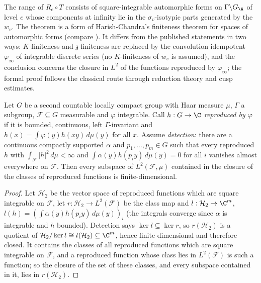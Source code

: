\begin{remark}
The range of $R_e\circ T$ consists of square-integrable automorphic forms on $\Gamma\backslash G_\A$ of level
$e$ whose components at infinity lie in the $\sigma_v$-isotypic parts generated by the $w_v$. The theorem is a form
of Harish-Chandra's finiteness theorem for spaces of automorphic forms \cite{HarishChandra1968} (compare
\cite{BorelJacquet1979}). It differs from the published statements in two ways: $K$-finiteness and
$\mathfrak z$-finiteness are replaced by the convolution idempotent $\varphi_\infty$ of integrable discrete series
(no $K$-finiteness of $w_v$ is assumed), and the conclusion concerns the closure in $L^2$ of the functions reproduced
by $\varphi_\infty$; the formal proof follows the classical route through reduction theory and cusp estimates.
\end{remark}

\begin{lemma}\label{pf:sh-local:fdlin}
Let $G$ be a second countable locally compact group with Haar measure $\mu$, $\Gamma$ a subgroup, $\mathcal F\subseteq
G$ measurable and $\varphi$ integrable. Call $h:G\to\C$ \emph{reproduced by $\varphi$} if it is bounded, continuous,
left $\Gamma$-invariant and $h(x)=\int\varphi(y)h(xy)\,d\mu(y)$ for all $x$. Assume \emph{detection}: there are a
continuous compactly supported $\alpha$ and $p_1,\dots,p_m\in G$ such that every reproduced $h$ with
$\int_{\mathcal F}|h|^2\,d\mu<\infty$ and $\int\alpha(y)h(p_iy)\,d\mu(y)=0$ for all $i$ vanishes almost everywhere on
$\mathcal F$. Then every subspace of $L^2(\mathcal F,\mu)$ contained in the closure of the classes of reproduced
functions is finite-dimensional.
\end{lemma}

\begin{proof}
Let $\mathcal H_2$ be the vector space of reproduced functions which are square integrable on $\mathcal F$, let
$r:\mathcal H_2\to L^2(\mathcal F)$ be the class map and $l:\mathcal H_2\to\C^m$,
$l(h)=(\int\alpha(y)h(p_iy)\,d\mu(y))_i$ (the integrals converge since $\alpha$ is integrable and $h$ bounded). Detection
says $\ker l\subseteq\ker r$, so $r(\mathcal H_2)$ is a quotient of $\mathcal H_2/\ker l\cong l(\mathcal H_2)\subseteq\C^m$,
hence finite-dimensional and therefore closed. It contains the classes of all reproduced functions which are square
integrable on $\mathcal F$, and a reproduced function whose class lies in $L^2(\mathcal F)$ is such a function; so the
closure of the set of these classes, and every subspace contained in it, lies in $r(\mathcal H_2)$.
\end{proof}

